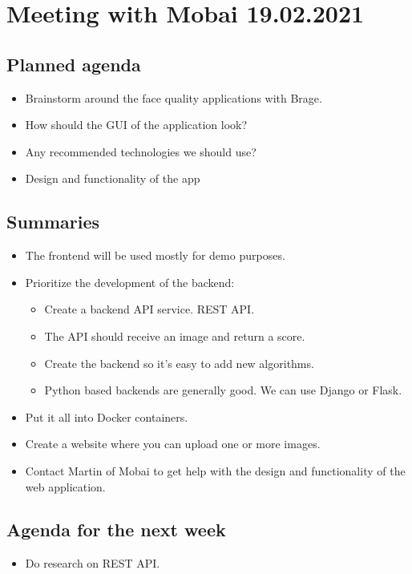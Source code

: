\section*{Meeting with Mobai 19.02.2021}
\subsection*{Planned agenda}
\begin{itemize}
    \item Brainstorm around the face quality applications with Brage.
    \item How should the GUI of the application look?
    \item Any recommended technologies we should use?
    \item Design and functionality of the app
\end{itemize}

\subsection*{Summaries}
\begin{itemize}
    \item The frontend will be used mostly for demo purposes.
    \item Prioritize the development of the backend:
    \begin{itemize}
        \item Create a backend API service. REST API.
        \item The API should receive an image and return a score.
        \item Create the backend so it’s easy to add new algorithms.
        \item Python based backends are generally good. We can use Django or Flask.
    \end{itemize}
    \item Put it all into Docker containers.
    \item Create a website where you can upload one or more images.
    \item Contact Martin of Mobai to get help with the design and functionality of the web application.
\end{itemize}

\subsection*{Agenda for the next week}
\begin{itemize}
    \item Do research on REST API.
\end{itemize}


